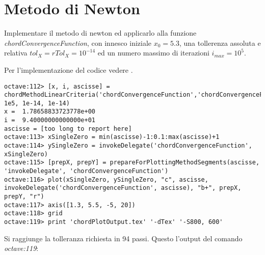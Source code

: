 \section{Metodo di Newton}
\label{sec:metodoDiNewton}

\begin{exercise}
Implementare il metodo di newton ed applicarlo alla funzione \emph{chordConvergenceFunction},
con innesco iniziale $x_{0} = 5.3$, una tollerenza assoluta e relativa
$tol_{X} = rTol_{X} = 10^{-14}$ ed un numero massimo di iterazioni
$i_{max} = 10^{5}$.
\end{exercise}
Per l'implementazione del codice vedere .
\begin{lstlisting}
octave:112> [x, i, ascisse] =
chordMethodLinearCriteria('chordConvergenceFunction','chordConvergenceFunctionDerivative',5.3, 1e5, 1e-14, 1e-14) 
x =  1.78658833723778e+00
i =  9.40000000000000e+01
ascisse = [too long to report here]
octave:113> xSingleZero = min(ascisse)-1:0.1:max(ascisse)+1
octave:114> ySingleZero = invokeDelegate('chordConvergenceFunction', xSingleZero)
octave:115> [prepX, prepY] = prepareForPlottingMethodSegments(ascisse, 'invokeDelegate', 'chordConvergenceFunction')
octave:116> plot(xSingleZero, ySingleZero, "c", ascisse, invokeDelegate('chordConvergenceFunction', ascisse), "b+", prepX, prepY, "r")
octave:117> axis([1.3, 5.5, -5, 20])
octave:118> grid
octave:119> print 'chordPlotOutput.tex' '-dTex' '-S800, 600'
\end{lstlisting}
Si raggiunge la tolleranza richiesta in 94 passi. Questo l'output del comando
\emph{octave:119}:
\begin{center}

\end{center}


